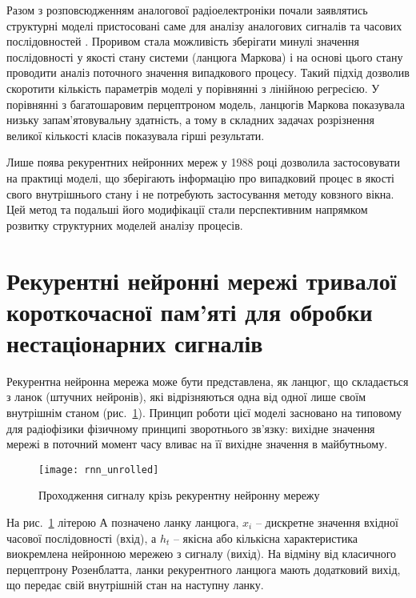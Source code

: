 Разом з розповсюдженням аналогової радіоелектроніки почали заявлятись 
структурні моделі пристосовані саме для аналізу аналогових сигналів 
та часових послідовностей \cite{imp:Markov1906}. Проривом стала можливість
зберігати минулі значення послідовності у якості стану системи 
(ланцюга Маркова) і на основі цього стану проводити аналіз поточного 
значення випадкового процесу. Такий підхід дозволив скоротити кількість 
параметрів моделі у порівнянні з лінійною регресією. У порівнянні з 
багатошаровим перцептроном модель, ланцюгів Маркова показувала низьку 
запам'ятовувальну здатність, а тому в складних задачах розрізнення великої 
кількості класів показувала гірші результати.

Лише поява рекурентних нейронних мереж у 1988 році \cite{imp:Rumelhart1988} 
дозволила застосовувати на практиці моделі, що зберігають інформацію про 
випадковий процес в якості свого внутрішнього стану і не потребують 
застосування методу ковзного вікна. Цей метод та подальші його модифікації
стали перспективним напрямком розвитку структурних моделей аналізу процесів. 


\section{Рекурентні нейронні мережі тривалої короткочасної пам'яті для 
обробки нестаціонарних сигналів}

Рекурентна нейронна мережа може бути представлена, як ланцюг, що складається
з ланок (штучних нейронів), які відрізняються одна від одної лише своїм 
внутрішнім станом (рис.~\ref{fig:rnn_unrolled}). Принцип роботи цієї моделі 
засновано на типовому для радіофізики фізичному принципі зворотнього зв'язку:
вихідне значення мережі в поточний момент часу вливає на її вихідне значення 
в майбутньому.

\begin{figure}[htbp] \begin{center}
\texttt{[image: rnn\_unrolled]}
\caption{Проходження сигналу крізь рекурентну нейронну мережу}
\label{fig:rnn_unrolled}
\end{center} \end{figure}

На рис.~\ref{fig:rnn_unrolled} літерою А позначено ланку ланцюга, $ x_i $ --
дискретне значення вхідної часової послідовності (вхід), а $ h_t $ -- якісна 
або кількісна характеристика виокремлена нейронною мережею з сигналу (вихід). 
На відміну від класичного перцептрону Розенблатта, ланки рекурентного ланцюга 
мають додатковий вихід, що передає свій внутрішній стан на наступну ланку.

